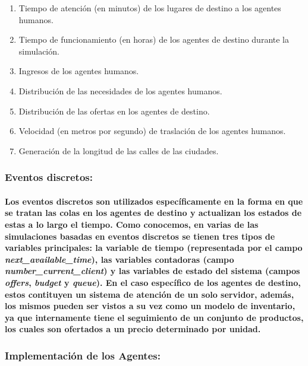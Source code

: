 \documentclass[12pt]{amsart}
\begin{document}
\begin {enumerate}
				\item Tiempo de atención (en minutos) de los lugares de destino a los agentes humanos.
				\item Tiempo de funcionamiento (en horas) de los agentes de destino durante la simulación.
				\item Ingresos de los agentes humanos.
				\item Distribución de las necesidades de los agentes humanos.
				\item Distribución de las ofertas en los agentes de destino.
				\item Velocidad (en metros por segundo) de traslación de los agentes humanos.
				\item Generación de la longitud de las calles de las ciudades.
\end {enumerate}

\subsubsection{Eventos discretos:}

\paragraph{Los eventos discretos son utilizados específicamente en la forma en que se tratan las colas en los agentes de destino y actualizan los estados de estas a lo largo el tiempo. Como conocemos, en varias de las simulaciones basadas en eventos discretos se tienen tres tipos de variables principales: la variable de tiempo (representada por el campo \textit{next\_available\_time}), las variables contadoras (campo \textit{number\_current\_client}) y las variables de estado del sistema (campos \textit{offers}, \textit{budget} y \textit{queue}). En el caso específico de los agentes de destino, estos contituyen un sistema de atención de un solo servidor, además, los mismos pueden ser vistos a su vez como un modelo de inventario, ya que internamente tiene el seguimiento de un conjunto de productos, los cuales son ofertados a un precio determinado por unidad.}

\subsubsection{Implementación de los Agentes:}
\end{document}
